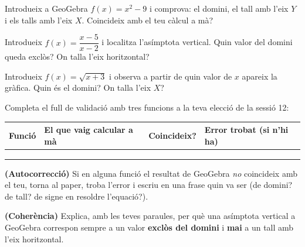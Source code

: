\begin{exercicis}
\begin{exlist}
  \item Introdueix a GeoGebra $f(x)=x^2-9$ i comprova: el domini, el tall amb l'eix
        $Y$ i els talls amb l'eix $X$. Coincideix amb el teu càlcul a mà?
  \item Introdueix $f(x)=\dfrac{x-5}{x-2}$ i localitza l'asímptota vertical. Quin
        valor del domini queda exclòs? On talla l'eix horitzontal?
  \item Introdueix $f(x)=\sqrt{x+3}$ i observa a partir de quin valor de $x$ apareix
        la gràfica. Quin és el domini? On talla l'eix $X$?
  \item Completa el full de validació amb tres funcions a la teva elecció de la
        sessió 12:
        \begin{center}
        \renewcommand{\arraystretch}{1.4}
        \begin{tabular}{p{3.2cm} p{3.2cm} p{2.2cm} p{2.6cm}}
        \toprule
        \textbf{Funció} & \textbf{El que vaig calcular a mà} & \textbf{Coincideix?} & \textbf{Error trobat (si n'hi ha)} \\
        \midrule
         & & & \\[10pt]
         & & & \\[10pt]
         & & & \\
        \bottomrule
        \end{tabular}
        \end{center}
  \item \textbf{(Autocorrecció)} Si en alguna funció el resultat de GeoGebra
        \emph{no} coincideix amb el teu, torna al paper, troba l'error i escriu en una
        frase quin va ser (de domini? de tall? de signe en resoldre l'equació?).
  \item \textbf{(Coherència)} Explica, amb les teves paraules, per què una asímptota
        vertical a GeoGebra correspon sempre a un valor \textbf{exclòs del domini} i
        \textbf{mai} a un tall amb l'eix horitzontal.
\end{exlist}
\end{exercicis}

